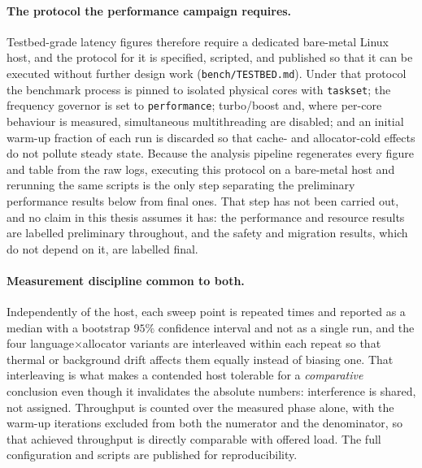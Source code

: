 \documentclass[english,twoside,openright,a4paper,censored,csm,software-track-2020]{HYthesisML}
\begin{document}
\paragraph{The protocol the performance campaign requires.}
Testbed-grade latency figures therefore require a dedicated bare-metal Linux host, and the
protocol for it is specified, scripted, and published so that it can be executed without
further design work (\texttt{bench/TESTBED.md}). Under that protocol the benchmark process is
pinned to isolated physical cores with \texttt{taskset}; the frequency governor is set to
\texttt{performance}; turbo/boost and, where per-core behaviour is measured, simultaneous
multithreading are disabled; and an initial warm-up fraction of each run is discarded so that
cache- and allocator-cold effects do not pollute steady state. Because the analysis pipeline
regenerates every figure and table from the raw logs, executing this protocol on a bare-metal
host and rerunning the same scripts is the only step separating the preliminary performance
results below from final ones. That step has not been carried out, and no claim in this
thesis assumes it has: the performance and resource results are labelled preliminary
throughout, and the safety and migration results, which do not depend on it, are labelled
final.

\paragraph{Measurement discipline common to both.}
Independently of the host, each sweep point is repeated \NRepeats{} times and reported as a
median with a bootstrap $95\%$ confidence interval and not as a single run, and the four
language$\times$allocator variants are interleaved within each repeat so that thermal or
background drift affects them equally instead of biasing one. That interleaving is what makes
a contended host tolerable for a \emph{comparative} conclusion even though it invalidates the
absolute numbers: interference is shared, not assigned. Throughput is counted over the measured
phase alone, with the warm-up iterations excluded from both the numerator and the denominator,
so that achieved throughput is directly comparable with offered load. The full configuration
and scripts are published for reproducibility.
\end{document}
